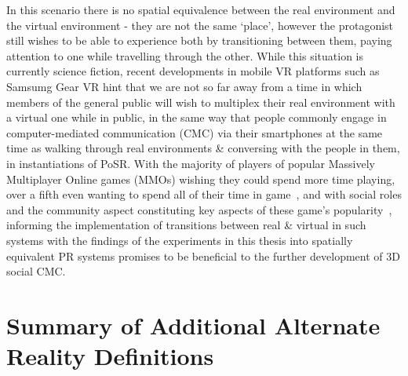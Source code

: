 In this scenario there is no spatial equivalence between the real environment and the virtual environment - they are not the same `place', however the protagonist still wishes to be able to experience both by transitioning between them, paying attention to one while travelling through the other. While this situation is currently science fiction, recent developments in mobile VR platforms such as Samsumg Gear VR hint that we are not so far away from a time in which members of the general public will wish to multiplex their real environment with a virtual one while in public, in the same way that people commonly engage in computer-mediated communication (CMC) via their smartphones at the same time as walking through real environments \& conversing with the people in them, in instantiations of PoSR. With the majority of players of popular Massively Multiplayer Online games (MMOs) wishing they could spend more time playing, over a fifth even wanting to spend all of their time in game~\cite{Castronova2006}, and with social roles and the community aspect constituting key aspects of these game's popularity~\cite{Castronova2006, Bartle2004}, informing the implementation of transitions between real \& virtual in such systems with the findings of the experiments in this thesis into spatially equivalent PR systems promises to be beneficial to the further development of 3D social CMC.




\section{Summary of Additional Alternate Reality Definitions}
\label{summaryofadditionalalternaterealitydefinitions}

